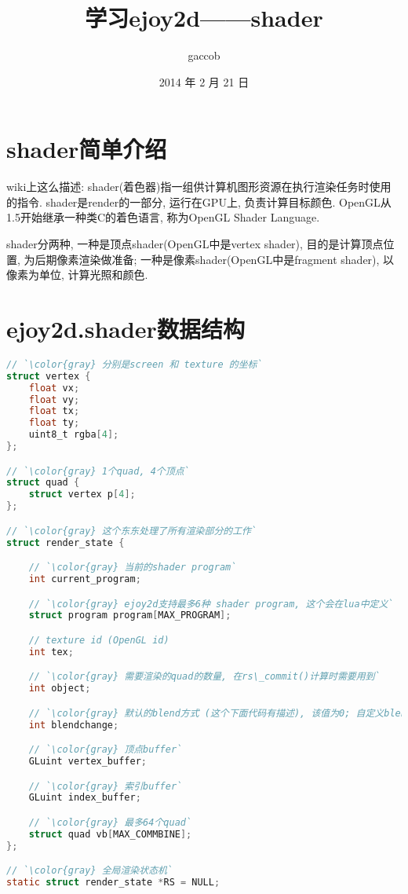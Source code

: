 

\title {\ZHH \huge 学习ejoy2d——shader}
\author {\small gaccob}
\date {\small 2014 年 2 月 21 日}
\maketitle


\section {\ZHH shader简单介绍} {
    {wiki上这么描述: shader(着色器)指一组供计算机图形资源在执行渲染任务时使用的指令. shader是render的一部分, 运行在GPU上, 负责计算目标颜色. OpenGL从1.5开始继承一种类C的着色语言, 称为OpenGL Shader Language.}\par
    {shader分两种, 一种是顶点shader(OpenGL中是vertex shader), 目的是计算顶点位置, 为后期像素渲染做准备; 一种是像素shader(OpenGL中是fragment shader), 以像素为单位, 计算光照和颜色. }\par
}


\section {\ZHH ejoy2d.shader数据结构} {
\begin{lstlisting}[language=C]
// `\color{gray} 分别是screen 和 texture 的坐标`
struct vertex {
    float vx;
    float vy;
    float tx;
    float ty;
    uint8_t rgba[4];
};

// `\color{gray} 1个quad, 4个顶点`
struct quad {
    struct vertex p[4];
};

// `\color{gray} 这个东东处理了所有渲染部分的工作`
struct render_state {

    // `\color{gray} 当前的shader program`
    int current_program;

    // `\color{gray} ejoy2d支持最多6种 shader program, 这个会在lua中定义`
    struct program program[MAX_PROGRAM];

    // texture id (OpenGL id)
    int tex;

    // `\color{gray} 需要渲染的quad的数量, 在rs\_commit()计算时需要用到`
    int object;

    // `\color{gray} 默认的blend方式 (这个下面代码有描述), 该值为0; 自定义blend方式时, 这个值=1`
    int blendchange;

    // `\color{gray} 顶点buffer`
    GLuint vertex_buffer;

    // `\color{gray} 索引buffer`
    GLuint index_buffer;

    // `\color{gray} 最多64个quad`
    struct quad vb[MAX_COMMBINE];
};

// `\color{gray} 全局渲染状态机`
static struct render_state *RS = NULL;
\end{lstlisting}
}


